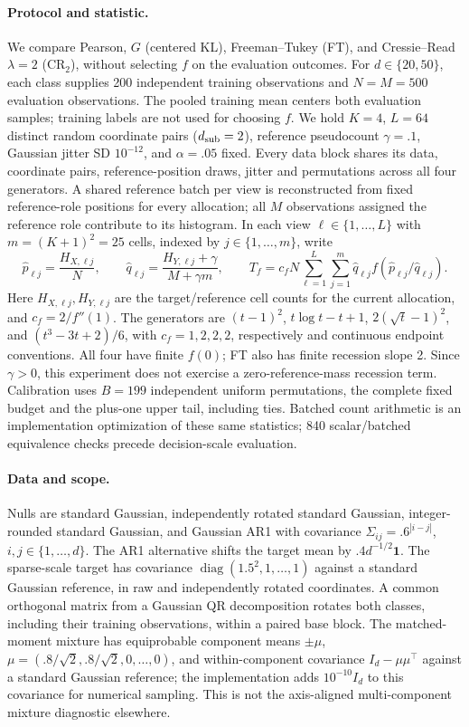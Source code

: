 {\color{purple}
\paragraph{Protocol and statistic.}
We compare Pearson, $G$ (centered KL), Freeman--Tukey (FT), and
Cressie--Read $\lambda=2$ (CR$_2$), without selecting $f$ on the evaluation
outcomes. For $d\in\{20,50\}$, each class supplies 200 independent training
observations and $N=M=500$ evaluation observations. The pooled training mean
centers both evaluation samples; training labels are not used for choosing $f$.
We hold $K=4$, $L=64$ distinct random coordinate pairs ($d_{\rm sub}=2$),
reference pseudocount $\gamma=.1$, Gaussian jitter SD $10^{-12}$, and
$\alpha=.05$ fixed. Every data block shares its data, coordinate pairs,
reference-position draws, jitter and permutations across all four generators.
A shared reference batch per view is reconstructed from fixed reference-role
positions for every allocation; all $M$ observations assigned the reference
role contribute to its histogram. In each view $\ell\in\{1,\ldots,L\}$
with $m=(K+1)^2=25$ cells, indexed by $j\in\{1,\ldots,m\}$, write
\[
 \widehat p_{\ell j}=\frac{H_{X,\ell j}}{N},\qquad
 \widehat q_{\ell j}=\frac{H_{Y,\ell j}+\gamma}{M+\gamma m},\qquad
 T_f=c_fN\sum_{\ell=1}^{L}\sum_{j=1}^{m}
 \widehat q_{\ell j}f(\widehat p_{\ell j}/\widehat q_{\ell j}).
\]
Here $H_{X,\ell j},H_{Y,\ell j}$ are the target/reference cell counts for the
current allocation, and $c_f=2/f''(1)$. The generators are
$(t-1)^2$, $t\log t-t+1$, $2(\sqrt t-1)^2$, and $(t^3-3t+2)/6$,
with $c_f=1,2,2,2$, respectively and continuous endpoint conventions.
All four have finite $f(0)$; FT also has finite recession slope 2. Since
$\gamma>0$, this experiment does not exercise a zero-reference-mass recession
term. Calibration uses $B=199$ independent uniform permutations, the complete
fixed budget and the plus-one upper tail, including ties. Batched count
arithmetic is an implementation optimization of these same statistics;
840 scalar/batched equivalence checks precede decision-scale evaluation.

\paragraph{Data and scope.}
Nulls are standard Gaussian, independently rotated standard Gaussian,
integer-rounded standard Gaussian, and Gaussian AR1 with covariance
$\Sigma_{ij}=.6^{|i-j|}$, $i,j\in\{1,\ldots,d\}$.
The AR1 alternative shifts the target mean by $.4d^{-1/2}\mathbf1$.
The sparse-scale target has covariance $\operatorname{diag}(1.5^2,1,\ldots,1)$
against a standard Gaussian reference, in raw and independently rotated
coordinates. A common orthogonal matrix from a Gaussian QR decomposition
rotates both classes, including their training observations, within a paired
base block. The matched-moment mixture has equiprobable component means
$\pm\mu$, $\mu=(.8/\sqrt2,.8/\sqrt2,0,\ldots,0)$, and within-component
covariance $I_d-\mu\mu^\top$ against a standard Gaussian reference; the
implementation adds $10^{-10}I_d$ to this covariance for numerical sampling.
This is not the axis-aligned multi-component mixture diagnostic elsewhere.

}
